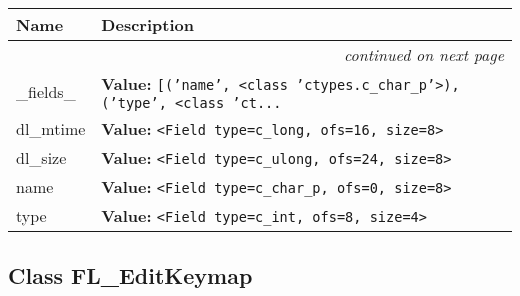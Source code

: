     \vspace{-1cm}
\hspace{\varindent}\begin{longtable}{|p{\varnamewidth}|p{\vardescrwidth}|l}
\cline{1-2}
\cline{1-2} \centering \textbf{Name} & \centering \textbf{Description}& \\
\cline{1-2}
\endhead\cline{1-2}\multicolumn{3}{r}{\small\textit{continued on next page}}\\\endfoot\cline{1-2}
\endlastfoot\raggedright \_\-f\-i\-e\-l\-d\-s\-\_\- & \raggedright \textbf{Value:} 
{\tt \texttt{[}\texttt{(}\texttt{'}\texttt{name}\texttt{'}\texttt{, }{\textless}class 'ctypes.c\_char\_p'{\textgreater}\texttt{)}\texttt{, }\texttt{(}\texttt{'}\texttt{type}\texttt{'}\texttt{, }{\textless}class 'ct\texttt{...}}&\\
\cline{1-2}
\raggedright d\-l\-\_\-m\-t\-i\-m\-e\- & \raggedright \textbf{Value:} 
{\tt {\textless}Field type=c\_long, ofs=16, size=8{\textgreater}}&\\
\cline{1-2}
\raggedright d\-l\-\_\-s\-i\-z\-e\- & \raggedright \textbf{Value:} 
{\tt {\textless}Field type=c\_ulong, ofs=24, size=8{\textgreater}}&\\
\cline{1-2}
\raggedright n\-a\-m\-e\- & \raggedright \textbf{Value:} 
{\tt {\textless}Field type=c\_char\_p, ofs=0, size=8{\textgreater}}&\\
\cline{1-2}
\raggedright t\-y\-p\-e\- & \raggedright \textbf{Value:} 
{\tt {\textless}Field type=c\_int, ofs=8, size=4{\textgreater}}&\\
\cline{1-2}
\end{longtable}



\subsection{Class FL\_EditKeymap}

